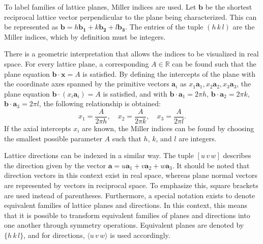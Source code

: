 To label families of lattice planes, Miller indices are used. Let $\mathbf{b}$ be
the shortest reciprocal lattice vector perpendicular to the plane being characterized.
This can be represented as
$\mathbf{b}= h \mathbf{b_1}+ k \mathbf{b_2}+ l \mathbf{b_3}$. The entries of the tuple
$(h\,k\,l )$ are the Miller indices, which by definition must be integers.

There is a geometric interpretation that allows the indices to be visualized in
real space. For every lattice plane, a corresponding $A \in \mathbb{R}$ can be
found such that the plane equation $\mathbf{b}\cdot \mathbf{x}= A$ is satisfied. By
defining the intercepts of the plane with the coordinate axes spanned by the primitive
vectors $\mathbf{a}_{i}$ as $x_{1}\mathbf{a}_{1}, x_{2}\mathbf{a}_{2}, x_{3}\mathbf{a}
_{3}$, the plane equation $\mathbf{b}\cdot (x_{i}\mathbf{a}_{i})=A$ is satisfied,
and with $\mathbf{b}\cdot \mathbf{a}_{1}=2\pi h$,
$\mathbf{b}\cdot \mathbf{a}_{2}=2\pi k$, $\mathbf{b}\cdot \mathbf{a}_{3}=2\pi l$,
the following relationship is obtained:
\begin{equation}
	x_{1}=\frac{A}{2\pi h}, \quad x_{2}=\frac{A}{2\pi k}, \quad x_{3}=\frac{A}{2\pi
	l}.
\end{equation}
If the axial intercepts $x_{i}$ are known, the Miller indices can be found by
choosing the smallest possible parameter $A$ such that $h$, $k$, and $l$ are
integers.

Lattice directions can be indexed in a similar way. The tuple $[u \,v \,w]$ describes
the direction given by the vector $\mathbf{a}= u\mathbf{a}_{1}+v\mathbf{a}_{2}+ w
\mathbf{a}_{3}$. It should be noted that direction vectors in this context exist
in real space, whereas plane normal vectors are represented by vectors in reciprocal
space. To emphasize this, square brackets are used instead of parentheses.
Furthermore, a special notation exists to denote equivalent families of lattice planes
and directions. In this context, this means that it is possible to transform equivalent
families of planes and directions into one another through symmetry operations.
Equivalent planes are denoted by $\{h\,k\,l\}$, and for directions,
$\langle u\,v\,w\rangle$ is used accordingly.

